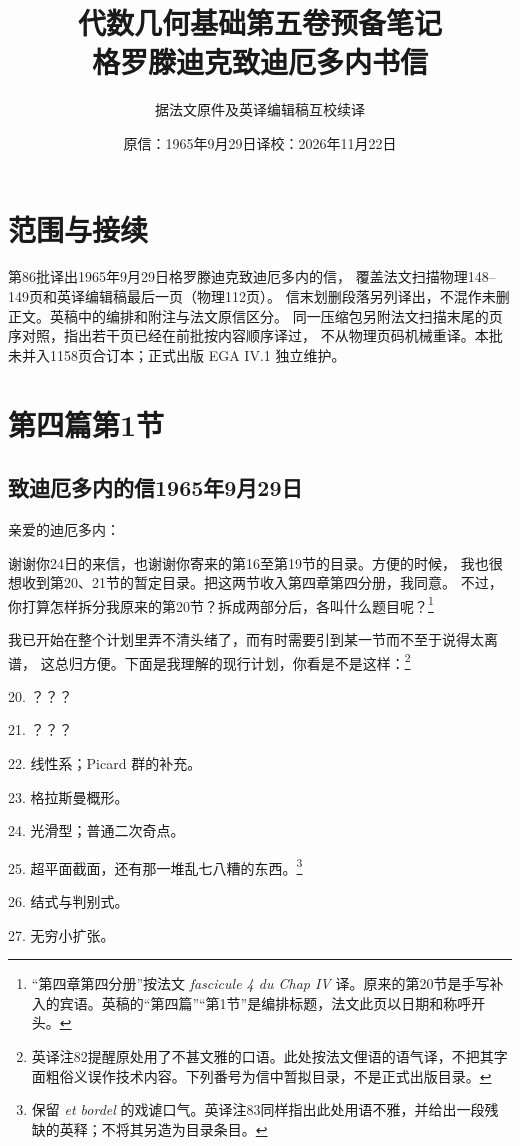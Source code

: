 \documentclass[openany,fontset=fandol]{ctexbook}
\begin{document}
\title{代数几何基础第五卷预备笔记\\格罗滕迪克致迪厄多内书信}
\author{据法文原件及英译编辑稿互校续译}
\date{原信：1965年9月29日\quad 译校：2026年11月22日}
\maketitle
\chapter*{范围与接续}
第86批译出1965年9月29日格罗滕迪克致迪厄多内的信，
覆盖法文扫描物理148--149页和英译编辑稿最后一页（物理112页）。
信末划删段落另列译出，不混作未删正文。英稿中的编排和附注与法文原信区分。
同一压缩包另附法文扫描末尾的页序对照，指出若干页已经在前批按内容顺序译过，
不从物理页码机械重译。本批未并入1158页合订本；正式出版 EGA IV.1 独立维护。

\chapter*{第四篇\quad 第1节}
\section*{致迪厄多内的信\quad 1965年9月29日}
\noindent 亲爱的迪厄多内：

谢谢你24日的来信，也谢谢你寄来的第16至第19节的目录。方便的时候，
我也很想收到第20、21节的暂定目录。把这两节收入第四章第四分册，我同意。
不过，你打算怎样拆分我原来的第20节？拆成两部分后，各叫什么题目呢？\footnote{“第四章第四分册”按法文 \emph{fascicule 4 du Chap IV} 译。原来的第20节是手写补入的宾语。英稿的“第四篇”“第1节”是编排标题，法文此页以日期和称呼开头。}

我已开始在整个计划里弄不清头绪了，而有时需要引到某一节而不至于说得太离谱，
这总归方便。下面是我理解的现行计划，你看是不是这样：\footnote{英译注82提醒原处用了不甚文雅的口语。此处按法文俚语的语气译，不把其字面粗俗义误作技术内容。下列番号为信中暂拟目录，不是正式出版目录。}

\begin{list}{}{\setlength{\leftmargin}{3em}\setlength{\itemsep}{1pt}\setlength{\topsep}{4pt}\setlength{\parsep}{0pt}}
 \item[20.] ？？？
 \item[21.] ？？？
 \item[22.] 线性系；Picard 群的补充。
 \item[23.] 格拉斯曼概形。
 \item[24.] 光滑型；普通二次奇点。
 \item[25.] 超平面截面，还有那一堆乱七八糟的东西。\footnote{保留 \emph{et bordel} 的戏谑口气。英译注83同样指出此处用语不雅，并给出一段残缺的英释；不将其另造为目录条目。}
 \item[26.] 结式与判别式。
 \item[27.] 无穷小扩张。
\end{list}
\end{document}

